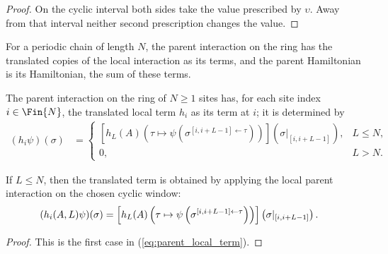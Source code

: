 \begin{proof}
    \leanok
    On the cyclic interval both sides take the value prescribed by $\upsilon$.
    Away from that interval neither second prescription changes the value.
\end{proof}

For a periodic chain of length $N$, the parent interaction on the ring has
the translated copies of the local interaction as its terms, and the parent
Hamiltonian is its Hamiltonian, the sum of these terms.

\begin{definition}\label{def:local_term_parent}
    \leanok
    The parent interaction on the ring of $N\ge1$ sites has, for each site
    index $i\in\Fin{N}$, the translated local term $h_i$ as its term at $i$;
    it is determined by
    \begin{align}
        (h_i\psi)(\sigma)
         & =
        \begin{cases}
            \left[h_L(A)
                \left(\tau\mapsto
                \psi\left(\sigma^{[i,i+L-1]\leftarrow\tau}\right)\right)\right]
            \left(\sigma|_{[i,i+L-1]}\right),
             & L\le N, \\
            0,
             & L>N.
        \end{cases}
        \label{eq:parent_local_term}
    \end{align}
\end{definition}

\begin{lemma}\label{lem:local_term_apply_of_le}
    \leanok
    If $L\le N$, then the translated term is obtained by applying the local
    parent interaction on the chosen cyclic window:
    \begin{align}
        (h_i(A,L)\psi)(\sigma)
         & =
        \left[h_L(A)
            \left(\tau\mapsto
            \psi\left(\sigma^{[i,i+L-1]\leftarrow\tau}\right)\right)\right]
        \left(\sigma|_{[i,i+L-1]}\right).
        \notag
    \end{align}
\end{lemma}

\begin{proof}
    \leanok
    This is the first case in (\ref{eq:parent_local_term}).
\end{proof}

